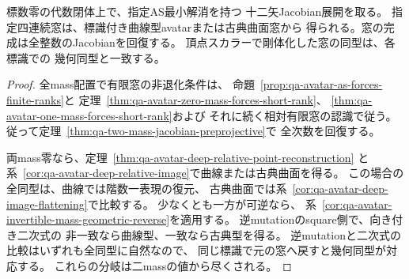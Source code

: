 \begin{theorem}[指定十二矢表示からの体上の幾何復元]
\label{thm:qa-avatar-presented-field-dictionary}
標数零の代数閉体上で、指定AS最小解消を持つ
十二矢Jacobian展開を取る。
指定四連続窓は、標識付き曲線型avatarまたは古典曲面窓から
得られる。窓の完成は全整数のJacobianを回復する。
頂点スカラーで剛体化した窓の同型は、各標識での
幾何同型と一致する。
\end{theorem}
\begin{proof}
全mass配置で有限窓の非退化条件は、
命題~\ref{prop:qa-avatar-as-forces-finite-ranks}と
定理~\ref{thm:qa-avatar-zero-mass-forces-short-rank}、
\ref{thm:qa-avatar-one-mass-forces-short-rank}および
それに続く相対有限窓の認識で従う。
従って定理~\ref{thm:qa-two-mass-jacobian-preprojective}で
全次数を回復する。

両mass零なら、定理~\ref{thm:qa-avatar-deep-relative-point-reconstruction}
と系~\ref{cor:qa-avatar-deep-relative-image}で曲線または古典曲面を得る。
この場合の全同型は、曲線では階数一表現の復元、
古典曲面では系~\ref{cor:qa-avatar-deep-image-flattening}で比較する。
少なくとも一方が可逆なら、
系~\ref{cor:qa-avatar-invertible-mass-geometric-reverse}を適用する。
逆mutationのsquare側で、向き付き二次式の
非一致なら曲線型、一致なら古典型を得る。
逆mutationと二次式の比較はいずれも全同型に自然なので、
同じ標識で元の窓へ戻すと幾何同型が対応する。
これらの分岐は二massの値から尽くされる。
\end{proof}

